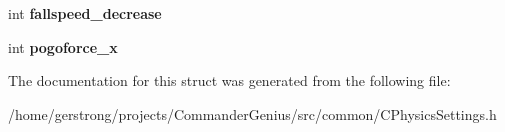 \begin{DoxyCompactItemize}
\item 
\hypertarget{struct_c_physics_settings_1_1playersettings_a320d78c95ce6ab2b56a7aab395e8e97d}{
int {\bfseries fallspeed\_\-decrease}}
\label{struct_c_physics_settings_1_1playersettings_a320d78c95ce6ab2b56a7aab395e8e97d}

\item 
\hypertarget{struct_c_physics_settings_1_1playersettings_a1c34f2dbec54bcfda90ed7db540c7c04}{
int {\bfseries pogoforce\_\-x}}
\label{struct_c_physics_settings_1_1playersettings_a1c34f2dbec54bcfda90ed7db540c7c04}

\end{DoxyCompactItemize}


The documentation for this struct was generated from the following file:\begin{DoxyCompactItemize}
\item 
/home/gerstrong/projects/CommanderGenius/src/common/CPhysicsSettings.h\end{DoxyCompactItemize}
